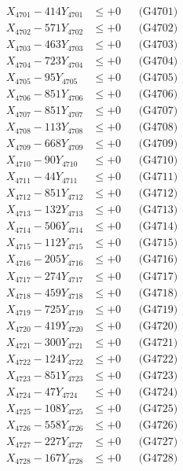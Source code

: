 \documentclass[a4paper,10pt]{article}
\begin{document}
{\begin{align}
\allowbreak
X_{4701} - 414Y_{4701} &\leq +0 && \text{(G4701)} \\
X_{4702} - 571Y_{4702} &\leq +0 && \text{(G4702)} \\
X_{4703} - 463Y_{4703} &\leq +0 && \text{(G4703)} \\
X_{4704} - 723Y_{4704} &\leq +0 && \text{(G4704)} \\
X_{4705} - 95Y_{4705} &\leq +0 && \text{(G4705)} \\
X_{4706} - 851Y_{4706} &\leq +0 && \text{(G4706)} \\
X_{4707} - 851Y_{4707} &\leq +0 && \text{(G4707)} \\
X_{4708} - 113Y_{4708} &\leq +0 && \text{(G4708)} \\
X_{4709} - 668Y_{4709} &\leq +0 && \text{(G4709)} \\
X_{4710} - 90Y_{4710} &\leq +0 && \text{(G4710)} \\
\allowbreak
X_{4711} - 44Y_{4711} &\leq +0 && \text{(G4711)} \\
X_{4712} - 851Y_{4712} &\leq +0 && \text{(G4712)} \\
X_{4713} - 132Y_{4713} &\leq +0 && \text{(G4713)} \\
X_{4714} - 506Y_{4714} &\leq +0 && \text{(G4714)} \\
X_{4715} - 112Y_{4715} &\leq +0 && \text{(G4715)} \\
X_{4716} - 205Y_{4716} &\leq +0 && \text{(G4716)} \\
X_{4717} - 274Y_{4717} &\leq +0 && \text{(G4717)} \\
X_{4718} - 459Y_{4718} &\leq +0 && \text{(G4718)} \\
X_{4719} - 725Y_{4719} &\leq +0 && \text{(G4719)} \\
X_{4720} - 419Y_{4720} &\leq +0 && \text{(G4720)} \\
\allowbreak
X_{4721} - 300Y_{4721} &\leq +0 && \text{(G4721)} \\
X_{4722} - 124Y_{4722} &\leq +0 && \text{(G4722)} \\
X_{4723} - 851Y_{4723} &\leq +0 && \text{(G4723)} \\
X_{4724} - 47Y_{4724} &\leq +0 && \text{(G4724)} \\
X_{4725} - 108Y_{4725} &\leq +0 && \text{(G4725)} \\
X_{4726} - 558Y_{4726} &\leq +0 && \text{(G4726)} \\
X_{4727} - 227Y_{4727} &\leq +0 && \text{(G4727)} \\
X_{4728} - 167Y_{4728} &\leq +0 && \text{(G4728)} \\

\end{align}}
\end{document}
